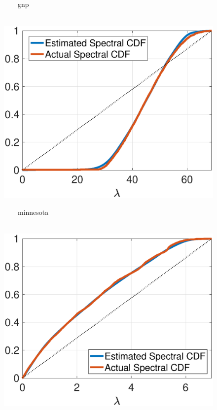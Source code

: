 \documentclass{article}
\begin{document}
\begin{figure}[bt] 
\begin{minipage}[m]{0.32\linewidth}
\centerline{\small{~~~~gnp}}
\centerline{~~\includegraphics[width=1.1\linewidth]{fig_gnp_cdf2}}
\end{minipage}
\begin{minipage}[m]{0.32\linewidth}
\centerline{\small{~~~~minnesota}}
\centerline{~~\includegraphics[width=1.1\linewidth]{fig_minnesota_cdf}}
\end{minipage}
\begin{minipage}[m]{0.32\linewidth}

\end{minipage}
\end{figure}
\end{document}
